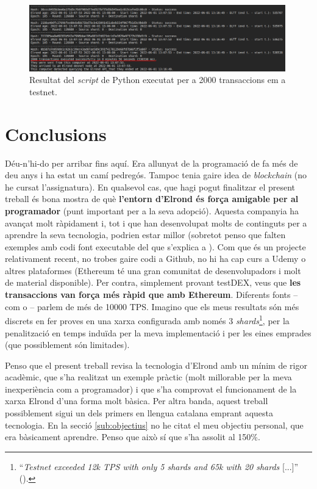 \documentclass[11pt,a4paper]{article}
\begin{document}
\begin{figure}[h]
\includegraphics[width=0.99\textwidth]{sendtestnet.png}
\centering
\caption{Resultat del \textit{script} de Python executat per a 2000 transaccions em a testnet.}\label{fig:sendtesnet}
\end{figure} 

\clearpage

\section{Conclusions}\label{sec:con}
Déu-n'hi-do per arribar fins aquí. Era allunyat de la programació de fa més de deu anys i ha estat un camí pedregós. Tampoc tenia gaire idea de \textit{blockchain} (no he cursat l'assignatura). En qualsevol cas, que hagi pogut finalitzar el present treball és bona mostra de què \textbf{l'entorn d'Elrond és força amigable per al programador} (punt important per a la seva adopció). Aquesta companyia ha avançat molt ràpidament i, tot i que han desenvolupat molts de continguts per a aprendre la seva tecnologia, podrien estar millor (sobretot penso que falten exemples amb codi font executable del que s'explica a \cite{elrond2022}). Com que és un projecte relativament recent, no trobes gaire codi a Github, no hi ha cap curs a Udemy o altres plataformes (Ethereum té una gran comunitat de desenvolupadors i molt de material disponible). Per contra, simplement provant testDEX, veus que \textbf{les transaccions van força més ràpid que amb Ethereum}. Diferents fonts --com \cite{mincub2019-2} o \cite{everstake2020}-- parlem de més de 10000 TPS. Imagino que els meus resultats són més discrets en fer proves en una xarxa configurada amb només 3 \textit{shards}\footnote{``\textit{Testnet exceeded 12k TPS with only 5 shards and 65k with 20 shards} [...]'' (\cite{paradigm2019}). }, per la penalització en temps induïda per la meva implementació i per les eines emprades (que possiblement són limitades).

Penso que el present treball revisa la tecnologia d'Elrond amb un mínim de rigor acadèmic, que s'ha realitzat un exemple pràctic (molt millorable per la meva inexperiència com a programador) i que s'ha comprovat el funcionament de la xarxa Elrond d'una forma molt bàsica. Per altra banda, aquest treball possiblement sigui un dels primers en llengua catalana emprant aquesta tecnologia. En la secció \ref{sub:objectius} no he citat el meu objectiu personal, que era bàsicament aprendre. Penso que això sí que s'ha assolit al 150\%.
\end{document}
